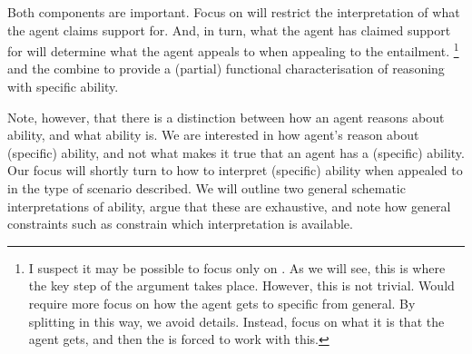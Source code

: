 \begin{note}
  Both components are important.
  Focus on \gsi{} will restrict the interpretation of what the agent claims support for.
  And, in turn, what the agent has claimed support for will determine what the agent appeals to when appealing to the \aben{} entailment.\nolinebreak
  \footnote{
    I suspect it may be possible to focus only on \gsi{}.
    As we will see, this is where the key step of the argument takes place.
    However, this is not trivial.
    Would require more focus on how the agent gets to specific from general.
    By splitting in this way, we avoid details.
    Instead, focus on what it is that the agent gets, and then the \aben{} is forced to work with this.
  }
  \gsi{} and the \aben{} combine to provide a (partial) functional characterisation of reasoning with specific ability.
\end{note}

\begin{note}
  Note, however, that there is a distinction between how an agent reasons about ability, and what ability is.
  We are interested in how agent's reason about (specific) ability, and not what makes it true that an agent has a (specific) ability.
  Our focus will shortly turn to how to interpret (specific) ability when appealed to in the type of scenario described.
  We will outline two general schematic interpretations of ability, argue that these are exhaustive, and note how general constraints such as \ESU{} constrain which interpretation is available.
\end{note}

